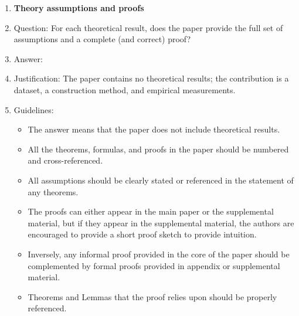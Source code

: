 \begin{enumerate}
\item {\bf Theory assumptions and proofs}
    \item[] Question: For each theoretical result, does the paper provide the full set of assumptions and a complete (and correct) proof?
    \item[] Answer: \answerNA{}
    \item[] Justification: The paper contains no theoretical results; the contribution is a dataset, a construction method, and empirical measurements.
    \item[] Guidelines:
    \begin{itemize}
        \item The answer \answerNA{} means that the paper does not include theoretical results. 
        \item All the theorems, formulas, and proofs in the paper should be numbered and cross-referenced.
        \item All assumptions should be clearly stated or referenced in the statement of any theorems.
        \item The proofs can either appear in the main paper or the supplemental material, but if they appear in the supplemental material, the authors are encouraged to provide a short proof sketch to provide intuition. 
        \item Inversely, any informal proof provided in the core of the paper should be complemented by formal proofs provided in appendix or supplemental material.
        \item Theorems and Lemmas that the proof relies upon should be properly referenced. 
    \end{itemize}


\end{enumerate}
